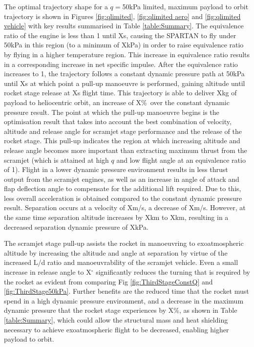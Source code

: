 \documentclass[]{aiaa-tc}
\newcommand{\PayloadImprovement}{X\%}
\newcommand{\qDecrease}{X\%}
\newcommand{\PayloadToOrbitFiftykPa}{X}
\newcommand{\SeparationAltFiftykPa}{X}
\newcommand{\SeparationvFiftykPa}{X}
\newcommand{\SeparationAngleFiftykPa}{X}
\newcommand{\SeparationqFiftykPa}{X}
\newcommand{\FlightTimeFiftykPa}{X}
\begin{document}
 
The optimal trajectory shape for a $q=$50kPa limited, maximum payload to orbit trajectory is shown in Figures \ref{fig:qlimited}, \ref{fig:qlimited aero} and \ref{fig:qlimited vehicle} with key results summarised in Table \ref{table:Summary}. 
The equivalence ratio of the engine is less than 1 until Xs, causing the SPARTAN to fly under 50kPa in this region (to a minimum of XkPa) in order to raise equivalence ratio by flying in a higher temperature region. This increase in equivalence ratio results in a corresponding increase in net specific impulse.
 After the equivalence ratio increases to 1, the trajectory follows a constant dynamic pressure path at 50kPa until Xs at which point a pull-up manoeuvre is performed, gaining altitude until rocket stage release at \FlightTimeFiftykPa s flight time. 
 This trajectory is able to deliver \PayloadToOrbitFiftykPa kg of payload to heliocentric orbit, an increase of \PayloadImprovement\ over the constant dynamic pressure result. The point at which the pull-up manoeuvre begins is the optimisation result that takes into account the best combination of velocity, altitude and release angle for scramjet stage performance and the release of the rocket stage. This pull-up indicates the region at which increasing altitude and release angle becomes more important than extracting maximum thrust from the scramjet (which is attained at high $q$ and low flight angle at an equivalence ratio of 1).
 Flight in a lower dynamic pressure environment results in less thrust output from the scramjet engines, as well as an increase in angle of attack and flap deflection angle to compensate for the additional lift required. Due to this, less overall acceleration is obtained compared to the constant dynamic pressure result. Separation occurs at a velocity of \SeparationvFiftykPa m/s, a decrease of Xm/s. However, at the same time separation altitude increases by Xkm to \SeparationAltFiftykPa km, resulting in a decreased separation dynamic pressure of \SeparationqFiftykPa kPa. 

The scramjet stage pull-up assists the rocket in manoeuvring to exoatmospheric altitude by increasing the altitude and angle at separation by virtue of the increased L/d ratio and manoeuvrability of the scramjet vehicle. Even a small increase in release angle to \SeparationAngleFiftykPa $^\circ$ significantly reduces the turning that is required by the rocket as evident from comparing Fig \ref{fig:ThirdStageConstQ} and \ref{fig:ThirdStage50kPa}. Further benefits are the reduced time that the rocket must spend in a high dynamic pressure environment, and a decrease in the maximum dynamic pressure that the rocket stage experiences by \qDecrease, as shown in Table \ref{table:Summary}, which could allow the structural mass and heat shielding necessary to achieve exoatmospheric flight to be decreased, enabling higher payload to orbit. 
\end{document}
